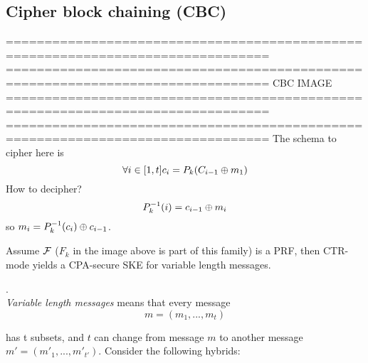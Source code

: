 \subsection{Cipher block chaining (CBC)}
================================================================================
================================================================================
                    CBC IMAGE
================================================================================
================================================================================
The schema to cipher here is 
\[ 
    \forall i \in [1,t] c_{i}=P_{k}(C_{i-1}\oplus m_{1})
\]
How to decipher?
\[
    P_{k}^{-1}(i)= c_{i-1} \oplus m_{i}
\]
so $m_{i}= P_{k}^{-1}(c_{i}) \oplus c_{i-1}$.\\

\begin{theorem}
    Assume $\mathcal{F}$ ($F_{k}$ in the image above is part of this family) is a PRF,
    then CTR-mode yields a CPA-secure SKE for variable length messages.
\end{theorem}.\\
\textit{Variable length messages}  means that  every message 
\[
    m=(m_{1}, ..., m_{t})
\]

has t subsets, and $t$ can change from message $m$ to another message
$m'=(m'_{1}, ..., m'_{t'})$.
Consider the following hybrids:

